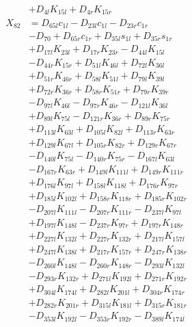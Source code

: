 \begin{multicols}{2}
\begin{align}
&+ D_{4l}K_{15l} + D_{4r}K_{15r} \nonumber \\
X_{82} &= D_{65l}c_{1l} - D_{23l}c_{1l} - D_{23r}c_{1r}  \nonumber \\
&- D_{70} + D_{65r}c_{1r} + D_{35l}s_{1l} + D_{35r}s_{1r}  \nonumber \\
&+ D_{17l}K_{23l} + D_{17r}K_{23r} - D_{44l}K_{15l}  \nonumber \\
&- D_{44r}K_{15r} + D_{51l}K_{46l} + D_{72l}K_{36l}  \nonumber \\
&+ D_{51r}K_{46r} + D_{58l}K_{51l} + D_{79l}K_{39l}  \nonumber \\
&+ D_{72r}K_{36r} + D_{58r}K_{51r} + D_{79r}K_{39r}  \nonumber \\
&- D_{97l}K_{46l} - D_{97r}K_{46r} - D_{121l}K_{36l}  \nonumber \\
&+ D_{89l}K_{75l} - D_{121r}K_{36r} + D_{89r}K_{75r}  \nonumber \\
&+ D_{113l}K_{63l} + D_{105l}K_{82l} + D_{113r}K_{63r}  \nonumber \\
&+ D_{129l}K_{67l} + D_{105r}K_{82r} + D_{129r}K_{67r}  \nonumber \\
&- D_{140l}K_{75l} - D_{140r}K_{75r} - D_{167l}K_{63l}  \nonumber \\
&- D_{167r}K_{63r} + D_{149l}K_{111l} + D_{149r}K_{111r}  \nonumber \\
&+ D_{176l}K_{97l} + D_{158l}K_{118l} + D_{176r}K_{97r}  \nonumber \\
&+ D_{185l}K_{102l} + D_{158r}K_{118r} + D_{185r}K_{102r}  \nonumber \\
&- D_{207l}K_{111l} - D_{207r}K_{111r} - D_{237l}K_{97l}  \nonumber \\
&+ D_{197l}K_{148l} - D_{237r}K_{97r} + D_{197r}K_{148r}  \nonumber \\
&+ D_{227l}K_{132l} + D_{227r}K_{132r} + D_{217l}K_{157l}  \nonumber \\
&+ D_{247l}K_{138l} + D_{217r}K_{157r} + D_{247r}K_{138r}  \nonumber \\
&- D_{260l}K_{148l} - D_{260r}K_{148r} - D_{293l}K_{132l}  \nonumber \\
&- D_{293r}K_{132r} + D_{271l}K_{192l} + D_{271r}K_{192r}  \nonumber \\
&+ D_{304l}K_{174l} + D_{282l}K_{201l} + D_{304r}K_{174r}  \nonumber \\
&+ D_{282r}K_{201r} + D_{315l}K_{181l} + D_{315r}K_{181r}  \nonumber \\
&- D_{353l}K_{192l} - D_{353r}K_{192r} - D_{389l}K_{174l}  \nonumber \\

\end{align}
\end{multicols}
